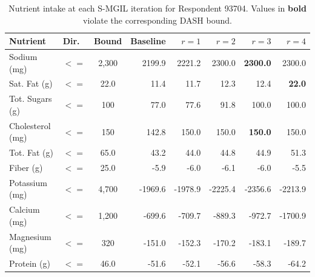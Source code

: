 \begin{table}[htbp]
\centering
\caption{Nutrient intake at each S-MGIL iteration for Respondent 93704. Values in \textbf{bold} violate the corresponding DASH bound.}
\label{tab:nutrient_intake}
\footnotesize
\begin{tabular}{llcrrrrr}
\toprule
Nutrient & Dir. & Bound & Baseline & $r=1$ & $r=2$ & $r=3$ & $r=4$ \\
\midrule
Sodium (mg) & $<=$ & 2,300 & 2199.9 & 2221.2 & 2300.0 & \textbf{2300.0} & 2300.0 \\
Sat. Fat (g) & $<=$ & 22.0 & 11.4 & 11.7 & 12.3 & 12.4 & \textbf{22.0} \\
Tot. Sugars (g) & $<=$ & 100 & 77.0 & 77.6 & 91.8 & 100.0 & 100.0 \\
Cholesterol (mg) & $<=$ & 150 & 142.8 & 150.0 & 150.0 & \textbf{150.0} & 150.0 \\
Tot. Fat (g) & $<=$ & 65.0 & 43.2 & 44.0 & 44.8 & 44.9 & 51.3 \\
Fiber (g) & $<=$ & 25.0 & -5.9 & -6.0 & -6.1 & -6.0 & -5.5 \\
Potassium (mg) & $<=$ & 4,700 & -1969.6 & -1978.9 & -2225.4 & -2356.6 & -2213.9 \\
Calcium (mg) & $<=$ & 1,200 & -699.6 & -709.7 & -889.3 & -972.7 & -1700.9 \\
Magnesium (mg) & $<=$ & 320 & -151.0 & -152.3 & -170.2 & -183.1 & -189.7 \\
Protein (g) & $<=$ & 46.0 & -51.6 & -52.1 & -56.6 & -58.3 & -64.2 \\
\bottomrule
\end{tabular}
\end{table}